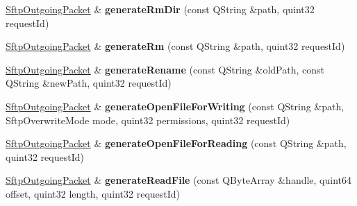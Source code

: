 \begin{DoxyCompactItemize}
\mbox{\label{class_q_ssh_1_1_internal_1_1_sftp_outgoing_packet_a39e6f247de41a2a616027238b76ab9a9}} 
\mbox{\hyperlink{class_q_ssh_1_1_internal_1_1_sftp_outgoing_packet}{Sftp\+Outgoing\+Packet}} \& {\bfseries generate\+Rm\+Dir} (const Q\+String \&path, quint32 request\+Id)
\item 
\mbox{\label{class_q_ssh_1_1_internal_1_1_sftp_outgoing_packet_a0f7d4a3ec34fc713e3d49be91d19abb3}} 
\mbox{\hyperlink{class_q_ssh_1_1_internal_1_1_sftp_outgoing_packet}{Sftp\+Outgoing\+Packet}} \& {\bfseries generate\+Rm} (const Q\+String \&path, quint32 request\+Id)
\item 
\mbox{\label{class_q_ssh_1_1_internal_1_1_sftp_outgoing_packet_a999204d66fa934233066d812c01b1f26}} 
\mbox{\hyperlink{class_q_ssh_1_1_internal_1_1_sftp_outgoing_packet}{Sftp\+Outgoing\+Packet}} \& {\bfseries generate\+Rename} (const Q\+String \&old\+Path, const Q\+String \&new\+Path, quint32 request\+Id)
\item 
\mbox{\label{class_q_ssh_1_1_internal_1_1_sftp_outgoing_packet_aa7e0ab1ea3357e4618f92fd68b9d8c91}} 
\mbox{\hyperlink{class_q_ssh_1_1_internal_1_1_sftp_outgoing_packet}{Sftp\+Outgoing\+Packet}} \& {\bfseries generate\+Open\+File\+For\+Writing} (const Q\+String \&path, Sftp\+Overwrite\+Mode mode, quint32 permissions, quint32 request\+Id)
\item 
\mbox{\label{class_q_ssh_1_1_internal_1_1_sftp_outgoing_packet_a8bb5466c11e58ddb6dcc1147cff82b99}} 
\mbox{\hyperlink{class_q_ssh_1_1_internal_1_1_sftp_outgoing_packet}{Sftp\+Outgoing\+Packet}} \& {\bfseries generate\+Open\+File\+For\+Reading} (const Q\+String \&path, quint32 request\+Id)
\item 
\mbox{\label{class_q_ssh_1_1_internal_1_1_sftp_outgoing_packet_aca389db644f09af0b2de213608fcb8cd}} 
\mbox{\hyperlink{class_q_ssh_1_1_internal_1_1_sftp_outgoing_packet}{Sftp\+Outgoing\+Packet}} \& {\bfseries generate\+Read\+File} (const Q\+Byte\+Array \&handle, quint64 offset, quint32 length, quint32 request\+Id)

\end{DoxyCompactItemize}

